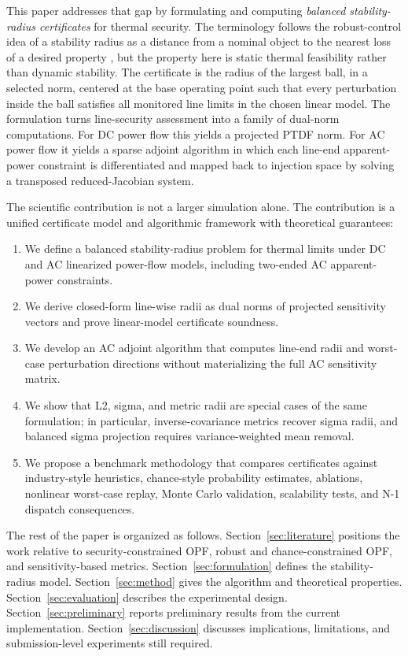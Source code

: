 \documentclass[11pt]{article}
\begin{document}
This paper addresses that gap by formulating and computing \emph{balanced stability-radius certificates} for thermal security. The terminology follows the robust-control idea of a stability radius as a distance from a nominal object to the nearest loss of a desired property \citep{HinrichsenPritchard1986}, but the property here is static thermal feasibility rather than dynamic stability. The certificate is the radius of the largest ball, in a selected norm, centered at the base operating point such that every perturbation inside the ball satisfies all monitored line limits in the chosen linear model. The formulation turns line-security assessment into a family of dual-norm computations. For DC power flow this yields a projected PTDF norm. For AC power flow it yields a sparse adjoint algorithm in which each line-end apparent-power constraint is differentiated and mapped back to injection space by solving a transposed reduced-Jacobian system.

The scientific contribution is not a larger simulation alone. The contribution is a unified certificate model and algorithmic framework with theoretical guarantees:
\begin{enumerate}[leftmargin=*]
  \item We define a balanced stability-radius problem for thermal limits under DC and AC linearized power-flow models, including two-ended AC apparent-power constraints.
  \item We derive closed-form line-wise radii as dual norms of projected sensitivity vectors and prove linear-model certificate soundness.
  \item We develop an AC adjoint algorithm that computes line-end radii and worst-case perturbation directions without materializing the full AC sensitivity matrix.
  \item We show that L2, sigma, and metric radii are special cases of the same formulation; in particular, inverse-covariance metrics recover sigma radii, and balanced sigma projection requires variance-weighted mean removal.
  \item We propose a benchmark methodology that compares certificates against industry-style heuristics, chance-style probability estimates, ablations, nonlinear worst-case replay, Monte Carlo validation, scalability tests, and N-1 dispatch consequences.
\end{enumerate}

The rest of the paper is organized as follows. Section~\ref{sec:literature} positions the work relative to security-constrained OPF, robust and chance-constrained OPF, and sensitivity-based metrics. Section~\ref{sec:formulation} defines the stability-radius model. Section~\ref{sec:method} gives the algorithm and theoretical properties. Section~\ref{sec:evaluation} describes the experimental design. Section~\ref{sec:preliminary} reports preliminary results from the current implementation. Section~\ref{sec:discussion} discusses implications, limitations, and submission-level experiments still required.
\end{document}
